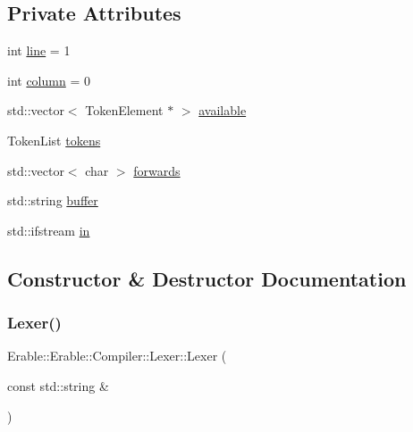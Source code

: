 \subsection*{Private Attributes}
\begin{DoxyCompactItemize}
\item 
int \mbox{\hyperlink{class_erable_1_1_erable_1_1_compiler_1_1_lexer_a4dbc5dd9b944e443de780deee15481a3}{line}} = 1
\item 
int \mbox{\hyperlink{class_erable_1_1_erable_1_1_compiler_1_1_lexer_a5b38024d3191b470cef97de7c8dee02b}{column}} = 0
\item 
std\+::vector$<$ Token\+Element $\ast$ $>$ \mbox{\hyperlink{class_erable_1_1_erable_1_1_compiler_1_1_lexer_af87f080c1f23a29f1227a09f39b95f08}{available}}
\item 
Token\+List \mbox{\hyperlink{class_erable_1_1_erable_1_1_compiler_1_1_lexer_aa036279dfcbdfae4cfa64541c4993250}{tokens}}
\item 
std\+::vector$<$ char $>$ \mbox{\hyperlink{class_erable_1_1_erable_1_1_compiler_1_1_lexer_a6ea8b70f652331a65c3c953730d1e9c4}{forwards}}
\item 
std\+::string \mbox{\hyperlink{class_erable_1_1_erable_1_1_compiler_1_1_lexer_ab1a2610f5b268009ab5f6aeddc681451}{buffer}}
\item 
std\+::ifstream \mbox{\hyperlink{class_erable_1_1_erable_1_1_compiler_1_1_lexer_a3911b97911961e72bbf8fdc363ceaec3}{in}}
\end{DoxyCompactItemize}


\subsection{Constructor \& Destructor Documentation}
\mbox{\label{class_erable_1_1_erable_1_1_compiler_1_1_lexer_a141128e9089058be9318db1f44af71ad}} 
\subsubsection{\texorpdfstring{Lexer()}{Lexer()}}
{\footnotesize\ttfamily Erable\+::\+Erable\+::\+Compiler\+::\+Lexer\+::\+Lexer (\begin{DoxyParamCaption}\item[{const std\+::string \&}]{ }\end{DoxyParamCaption})\hspace{0.3cm}{\ttfamily [explicit]}}



